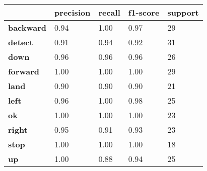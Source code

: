\begin{table}[H]
    \centering
    \begin{tabular}{|lllll|}
        \hline
        \multicolumn{1}{|l|}{\textbf{}}             & \multicolumn{1}{l|}{\textbf{precision}} & \multicolumn{1}{l|}{\textbf{recall}} & \multicolumn{1}{l|}{\textbf{f1-score}} & \textbf{support} \\ \hline
        \multicolumn{1}{|l|}{\textbf{backward}}     & \multicolumn{1}{l|}{0.94}               & \multicolumn{1}{l|}{1.00}            & \multicolumn{1}{l|}{0.97}              & 29               \\ \hline
        \multicolumn{1}{|l|}{\textbf{detect}}       & \multicolumn{1}{l|}{0.91}               & \multicolumn{1}{l|}{0.94}            & \multicolumn{1}{l|}{0.92}              & 31               \\ \hline
        \multicolumn{1}{|l|}{\textbf{down}}         & \multicolumn{1}{l|}{0.96}               & \multicolumn{1}{l|}{0.96}            & \multicolumn{1}{l|}{0.96}              & 26               \\ \hline
        \multicolumn{1}{|l|}{\textbf{forward}}      & \multicolumn{1}{l|}{1.00}               & \multicolumn{1}{l|}{1.00}            & \multicolumn{1}{l|}{1.00}              & 29               \\ \hline
        \multicolumn{1}{|l|}{\textbf{land}}         & \multicolumn{1}{l|}{0.90}               & \multicolumn{1}{l|}{0.90}            & \multicolumn{1}{l|}{0.90}              & 21               \\ \hline
        \multicolumn{1}{|l|}{\textbf{left}}         & \multicolumn{1}{l|}{0.96}               & \multicolumn{1}{l|}{1.00}            & \multicolumn{1}{l|}{0.98}              & 25               \\ \hline
        \multicolumn{1}{|l|}{\textbf{ok}}           & \multicolumn{1}{l|}{1.00}               & \multicolumn{1}{l|}{1.00}            & \multicolumn{1}{l|}{1.00}              & 23               \\ \hline
        \multicolumn{1}{|l|}{\textbf{right}}        & \multicolumn{1}{l|}{0.95}               & \multicolumn{1}{l|}{0.91}            & \multicolumn{1}{l|}{0.93}              & 23               \\ \hline
        \multicolumn{1}{|l|}{\textbf{stop}}         & \multicolumn{1}{l|}{1.00}               & \multicolumn{1}{l|}{1.00}            & \multicolumn{1}{l|}{1.00}              & 18               \\ \hline
        \multicolumn{1}{|l|}{\textbf{up}}           & \multicolumn{1}{l|}{1.00}               & \multicolumn{1}{l|}{0.88}            & \multicolumn{1}{l|}{0.94}              & 25               \\ \hline

\end{tabular}
\end{table}
